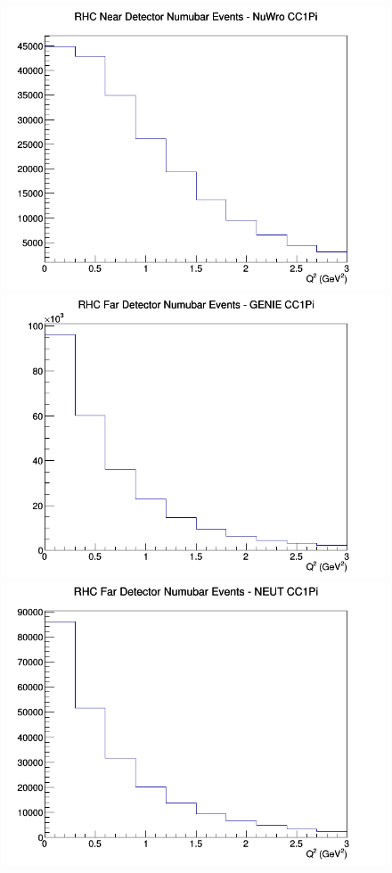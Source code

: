 \documentclass[12pt]{article}
\begin{document}
\begin{figure}[h]
\includegraphics[width=\linewidth]{Q2/nominal/CC1Pi_RHC_ND_numubar_Q2_NuWro.png}
\endminipage
\newline
{}
\includegraphics[width=\linewidth]{Q2/nominal/CC1Pi_RHC_FD_numubar_Q2_GENIE.png}
\endminipage
{}
\includegraphics[width=\linewidth]{Q2/nominal/CC1Pi_RHC_FD_numubar_Q2_NEUT.png}

\end{figure}
\end{document}
